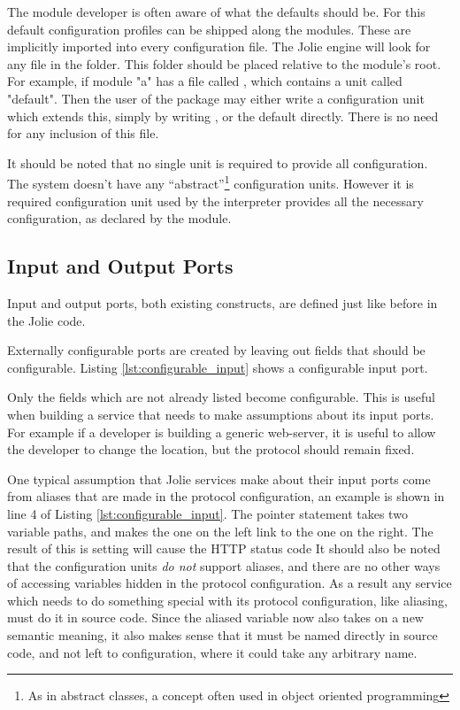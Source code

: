 The module developer is often aware of what the defaults should be. For this
default configuration profiles can be shipped along the modules. These
are implicitly imported into every configuration file. The Jolie engine will
look for any  file in the  folder. This folder should be
placed relative to the module's root. For example, if module "a" has a file
called , which contains a unit called "default".
Then the user of the package may either write a configuration unit which
extends this, simply by writing , or the default directly. There is no need for any
    inclusion of this file.

It should be noted that no single unit is required to provide all
configuration. The system doesn't have any ``abstract''\footnote{As in abstract
classes, a concept often used in object oriented programming} configuration
units. However it is required configuration unit used by the interpreter
provides all the necessary configuration, as declared by the module.

\subsection{Input and Output Ports}

%

Input and output ports, both existing constructs, are defined just like before
in the Jolie code.

Externally configurable ports are created by leaving out fields that should be
configurable. Listing \ref{lst:configurable_input} shows a configurable input
port.

Only the fields which are not already listed become configurable. This is
useful when building a service that needs to make assumptions about its input
ports. For example if a developer is building a generic web-server, it is
useful to allow the developer to change the location, but the protocol should
remain fixed.

One typical assumption that Jolie services make about their input ports come
from aliases that are made in the protocol configuration, an example is shown
in line 4 of Listing \ref{lst:configurable_input}. The pointer statement takes
two variable paths, and makes the one on the left link to the one on the right.
The result of this is setting  will cause the HTTP status code
It should also be noted that the configuration units \emph{do not} support
aliases, and there are no other ways of accessing variables hidden in the
protocol configuration. As a result any service which needs to do something
special with its protocol configuration, like aliasing, must do it in source
code. Since the aliased variable now also takes on a new semantic meaning, it
also makes sense that it must be named directly in source code, and not left to
configuration, where it could take any arbitrary name.

